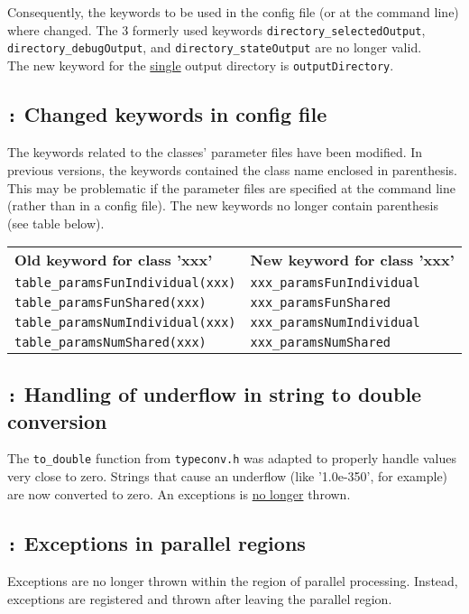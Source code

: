 \documentclass[a4paper,10pt]{article}
\newcommand{\logentry}[2]{\subsection*{\texttt{\color{red}{#1}:} \large{\textbf{#2}}}}
\begin{document}
Consequently, the keywords to be used in the config file (or at the command line) where changed. The 3 formerly used keywords \verb!directory_selectedOutput!, \verb!directory_debugOutput!, and \verb!directory_stateOutput! are no longer valid. \\ \medskip The new keyword for the \underline{single} output directory is \verb!outputDirectory!.

\logentry{2012-05-02}{Changed keywords in config file}
The keywords related to the classes' parameter files have been modified. In previous versions, the keywords contained the class name enclosed in parenthesis. This may be problematic if the parameter files are specified at the command line (rather than in a config file). The new keywords no longer contain parenthesis (see table below).

\medskip
\begin{tabular}{ll}
\textbf{Old keyword for class 'xxx'} & \textbf{New keyword for class 'xxx'} \\
\verb!table_paramsFunIndividual(xxx)! & \verb!xxx_paramsFunIndividual! \\
\verb!table_paramsFunShared(xxx)! & \verb!xxx_paramsFunShared! \\
\verb!table_paramsNumIndividual(xxx)! & \verb!xxx_paramsNumIndividual! \\
\verb!table_paramsNumShared(xxx)! & \verb!xxx_paramsNumShared! \\
\end{tabular}

\logentry{2012-02-28}{Handling of underflow in string to double conversion}
The \verb!to_double! function from \verb!typeconv.h! was adapted to properly handle values very close to zero. Strings that cause an underflow (like '1.0e-350', for example) are now converted to zero. An exceptions is \underline{no longer} thrown.

\logentry{2012-02-28}{Exceptions in parallel regions}
Exceptions are no longer thrown within the region of parallel processing. Instead, exceptions are registered and thrown after leaving the parallel region.
\end{document}
